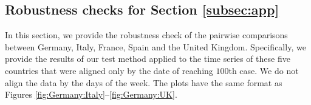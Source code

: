 \documentclass[a4paper,12pt]{article}
\numberwithin{equation}{section}
\begin{document}
\clearpage
{\color{red}
\subsection{Robustness checks for Section \ref{subsec:app}}\label{s:subsec:app:2}

In this section, we provide the robustness check of the pairwise comparisons between Germany, Italy, France, Spain and the United Kingdom. Specifically, we provide the results of our test method applied to the time series of these five countries that were aligned only by the date of reaching $100$th case. We do not align the data by the days of the week. The plots have the same format as Figures \ref{fig:Germany:Italy}--\ref{fig:Germany:UK}.
\begin{figure}[h!]
\begin{minipage}[t]{0.49\textwidth}

\end{minipage}
\end{figure}}
\end{document}

